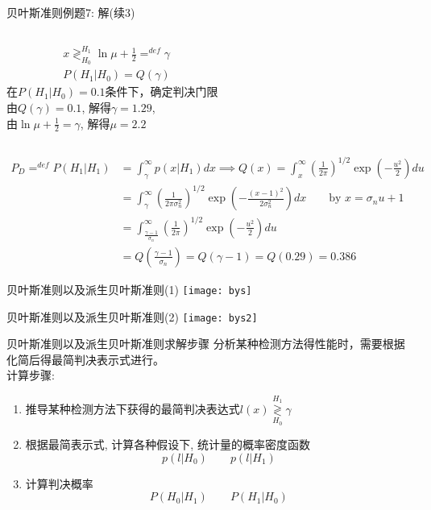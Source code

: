 \begin{frame}[shrink]{贝叶斯准则例题7: 解(续3)}
\begin{columns}
\begin{align*}
&x\mathop{\gtrless}_{H_0}^{H_1}\ln\mu+\frac{1}{2}\mathop{=}^{def}\gamma\\
&P(H_1|H_0)=Q(\gamma)
\end{align*} 
在$P(H_1|H_0)=0.1$条件下，确定判决门限\\
由$Q(\gamma)=0.1$, 解得$\gamma=1.29$,\\
由$\ln\mu+\frac{1}{2}=\gamma$, 解得$\mu=2.2$
\leftline{\texttt{[image: ex3-7]}}
\end{columns}
\begin{align*}
P_D\mathop{=}^{def}P(H_1|H_1)&=\int_{\gamma}^{\infty}p(x|H_1)dx\implies Q(x)=\int_{x}^{\infty}\left(\frac{1}{2\pi}\right)^{1/2}\exp\left(-\frac{u^2}{2}\right)du\\
&=\int_{\gamma}^{\infty}\left(\frac{1}{2\pi\sigma_n^2}\right)^{1/2}\exp\left(-\frac{(x-1)^2}{2\sigma_n^2}\right)dx\qquad \text{by } x=\sigma_nu+1\\
&=\int_{\frac{\gamma-1}{\sigma_n}}^{\infty}\left(\frac{1}{2\pi}\right)^{1/2}\exp\left(-\frac{u^2}{2}\right)du\\
&=Q\left(\frac{\gamma-1}{\sigma_n}\right)=Q(\gamma-1)=Q(0.29)=0.386
\end{align*}
\end{frame}

\begin{frame}[shrink]{贝叶斯准则以及派生贝叶斯准则(1)}
\texttt{[image: bys]}
\end{frame}

\begin{frame}[shrink]{贝叶斯准则以及派生贝叶斯准则(2)}
\texttt{[image: bys2]}
\end{frame}

\begin{frame}[shrink]{贝叶斯准则以及派生贝叶斯准则求解步骤}
分析某种检测方法得性能时，需要根据化简后得最简判决表示式进行。\\
计算步骤:\\
\begin{enumerate}
\item 推导某种检测方法下获得的最简判决表达式$l(x)\mathop{\gtrless}\limits_{H_0}^{H_1}\gamma$
\item 根据最简表示式, 计算各种假设下, 统计量的概率密度函数
\[p(l|H_0)\qquad p(l|H_1) \]
\item 计算判决概率\\
\[P(H_0|H_1)\qquad P(H_1|H_0) \]
\end{enumerate}
\end{frame}

